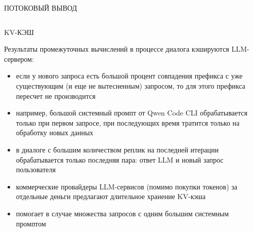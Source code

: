 \documentclass[aspectratio=169]{beamer}
\begin{document}
{\begin{frame}[fragile]{ПОТОКОВЫЙ ВЫВОД}
\begin{verbatim}
    \end{verbatim}
    
\end{frame}
  
 \begin{frame}{KV-КЭШ}
     
     Результаты промежуточных вычислений в процессе диалога кэшируются LLM-сервером:
     \begin{itemize}
         \item [-] если у нового запроса есть большой процент совпадения префикса с уже существующим (и еще не вытесненным) запросом, то для этого префикса пересчет не производится
         \item [-] например, большой системный промпт от Qwen Code CLI обрабатывается только при первом запросе, при последующих время тратится только на обработку новых данных         
         \item [-] в диалоге с большим количеством реплик на последней итерации обрабатывается только последняя пара: ответ LLM и новый запрос пользователя
         \item [-] коммерческие провайдеры LLM-сервисов (помимо покупки токенов) за отдельные деньги предлагают длительное хранение KV-кэша
         \item [-] помогает в случае множества запросов с одним большим системным промптом         
     \end{itemize}
     
     
 \end{frame}  
    
  
    } %
    
\end{document}
